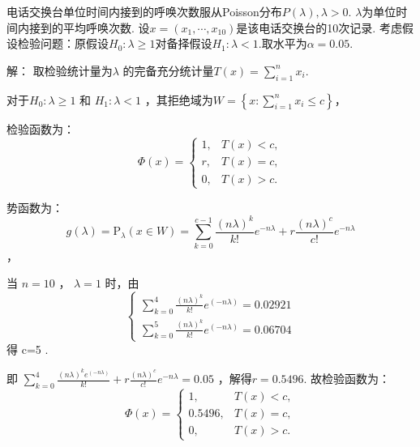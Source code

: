 \begin{example}
    电话交换台单位时间内接到的呼唤次数服从Poisson分布$ P(\lambda) , \lambda>0 .$ $\lambda $为单位时间内接到的平均呼唤次数. 设$ x=(x_1,\cdots,x_{10}) $是该电话交换台的10次记录. 考虑假设检验问题：原假设$ H_{0}: \lambda \geqslant 1 $对备择假设$ H_{1}: \lambda<1 . $取水平为$ \alpha=0.05 .$

解：
取检验统计量为$ \lambda$ 的完备充分统计量$ T(x)=\sum_{i=1}^{n} x_{i} .$

对于$ H_{0}: \lambda \geqslant 1$ 和 $H_{1}: \lambda<1$ ，其拒绝域为$ W=\left\{x: \sum_{i=1}^{n} x_{i} \leqslant c\right\} $，

检验函数为：
\[
    \Phi(x)=\left\{\begin{array}{ll}1, & T(x)<c, \\ r, & T(x)=c, \\ 0, & T(x)>c.\end{array}\right.
\]

势函数为： 
\[
    g(\lambda)=\text{P}_{\lambda}(x \in W)=\sum_{k=0}^{c-1} \frac{(n\lambda)^k}{k !}e^{-n\lambda}+r \frac{(n\lambda)^{c}}{c!} e^{-n \lambda}
\] ，

当 $n=10$ ， $\lambda=1$ 时，由 
\[
    \left\{\begin{array}{l}\sum_{k=0}^{4} \frac{(n \lambda)^{k} }{k !}e^{(-n\lambda)}=0.02921 \\ \sum_{k=0}^{5} \frac{(n \lambda)^{k}}{k !}e^{(-n\lambda)}=0.06704 \end{array}\right.
\]
得 c=5 .

即 $\sum_{k=0}^{4} \frac{(n \lambda)^{k} e^{(-n \lambda)}}{k !}+r \frac{(n \lambda)^{c}}{c !} e^{-n \lambda}=0.05$ ，解得$ r=0.5496 .$
故检验函数为： 
\[
\Phi(x)=\left\{\begin{array}{ll}1, & T(x)<c, \\ 0.5496, & T(x)=c, \\ 0, & T(x)>c.\end{array}\right. 
\]
\end{example}
